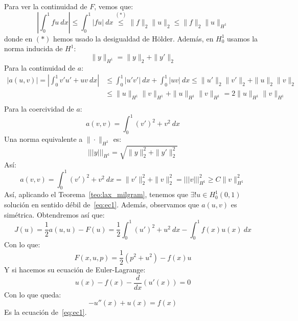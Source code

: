 \begin{ejemplo}
    \noindent
    Para ver la continuidad de $F$, vemos que:
    \begin{equation*}
        \left|\int_{0}^{1} fu~dx \right|\leq \int_{0}^{1} |fu|~dx \stackrel{(\ast)}{\leq} \|f\|_2\|u\|_2 \leq \|f\|_2 \|u\|_{H^1}
    \end{equation*}
    donde en $(\ast)$ hemos usado la desigualdad de Hölder. Además, en $H_0^1$ usamos la norma inducida de $H^1$:
    \begin{equation*}
        \|y\|_{H^1} = \|y\|_2 + \|y'\|_2
    \end{equation*}
    Para la continuidad de $a$:
    \begin{align*}
        |a(u,v)| = \left|\int_{0}^{1} v'u'+uv~dx \right| &\leq \int_{0}^{1} |u'v'|~dx  + \int_{0}^{1} |uv|~dx  \leq \|u'\|_2\|v'\|_2 + \|u\|_2\|v\|_2 \\
         &\leq \|u\|_{H^1}\|v\|_{H^1} + \|u\|_{H^1}\|v\|_{H^1} = 2\|u\|_{H^1}\|v\|_{H^1} \\
    \end{align*}
    Para la coercividad de $a$:
    \begin{equation*}
        a(v,v) = \int_{0}^{1} {(v')}^{2}+v^2~dx 
    \end{equation*}
    Una norma equivalente a $\|\cdot \|_{H^1}$ es:
    \begin{equation*}
        \lvert\!\lvert\!\lvert y\rvert\!\rvert\!\rvert_{H^1} = \sqrt{\|y\|^2_2 + \|y'\|_2^2}
    \end{equation*}
    Así:
    \begin{equation*}
        a(v,v) = \int_{0}^{1} {(v')}^{2}+v^2~dx = \|v'\|^2_2 + \|v\|^2_2 = \lvert\!\lvert\!\lvert v\rvert\!\rvert\!\rvert_{H^1}^2 \geq C\|v\|^2_{H^1}
    \end{equation*}
    Así, aplicando el Teorema~\ref{teo:lax_milgram}, tenemos que $\exists ! u\in H_0^1(0,1)$ solución en sentido débil de~\eqref{eq:ec1}. Además, observamos que $a(u,v)$ es simétrica. Obtendremos así que:
    \begin{equation*}
        J(u) = \frac{1}{2}a(u,u) - F(u) = \frac{1}{2}\int_{0}^{1} {(u')}^{2}+u^2~dx  - \int_{0}^{1} f(x)u(x)~dx 
    \end{equation*}
    Con lo que:
    \begin{equation*}
        F(x,u,p) = \frac{1}{2}(p^2 + u^2) - f(x)u
    \end{equation*}
    Y si hacemos su ecuación de Euler-Lagrange:
    \begin{equation*}
        u(x) - f(x) - \frac{d}{dx}(u'(x)) = 0
    \end{equation*}
    Con lo que queda:
    \begin{equation*}
        -u''(x) + u(x) = f(x)
    \end{equation*}
    Es la ecuación de~\eqref{eq:ec1}.
\end{ejemplo}

